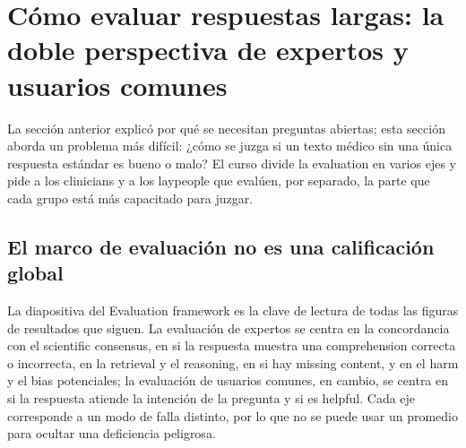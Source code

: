 \section{Cómo evaluar respuestas largas: la doble perspectiva de expertos y usuarios comunes}

La sección anterior explicó por qué se necesitan preguntas abiertas; esta sección aborda un problema más difícil: ¿cómo se juzga si un texto médico sin una única respuesta estándar es bueno o malo? El curso divide la evaluation en varios ejes y pide a los clinicians y a los laypeople que evalúen, por separado, la parte que cada grupo está más capacitado para juzgar.

\subsection{El marco de evaluación no es una calificación global}

La diapositiva del Evaluation framework es la clave de lectura de todas las figuras de resultados que siguen. La evaluación de expertos se centra en la concordancia con el scientific consensus, en si la respuesta muestra una comprehension correcta o incorrecta, en la retrieval y el reasoning, en si hay missing content, y en el harm y el bias potenciales; la evaluación de usuarios comunes, en cambio, se centra en si la respuesta atiende la intención de la pregunta y si es helpful. Cada eje corresponde a un modo de falla distinto, por lo que no se puede usar un promedio para ocultar una deficiencia peligrosa.




